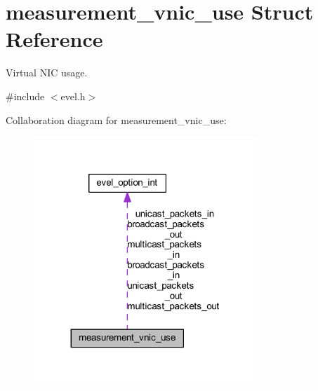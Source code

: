 \hypertarget{structmeasurement__vnic__use}{}\section{measurement\+\_\+vnic\+\_\+use Struct Reference}
\label{structmeasurement__vnic__use}


Virtual N\+IC usage.  




{\ttfamily \#include $<$evel.\+h$>$}



Collaboration diagram for measurement\+\_\+vnic\+\_\+use\+:
\nopagebreak
\begin{figure}[H]
\begin{center}
\leavevmode
\includegraphics[width=239pt]{structmeasurement__vnic__use__coll__graph}
\end{center}
\end{figure}
